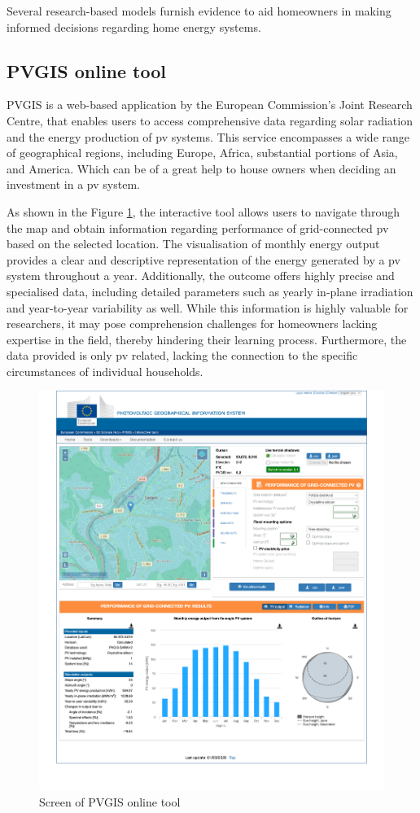 Several research-based models furnish evidence to aid homeowners in making informed decisions regarding home energy systems.


\subsection{PVGIS online tool}
PVGIS \cite{pvgis} is a web-based application by the European Commission's Joint Research Centre, 
that enables users to access comprehensive data regarding solar radiation and the energy production of \gls{pv} systems. 
This service encompasses a wide range of geographical regions, including Europe, Africa, substantial portions of Asia, and America.
Which can be of a great help to house owners when deciding an investment in a \gls{pv} system. 

As shown in the Figure \ref{fig:pvgis}, the interactive tool allows users to navigate through the map and obtain information regarding performance of grid-connected \gls{pv} based on the selected location. 
The visualisation of monthly energy output provides a clear and descriptive representation of the energy generated by a \gls{pv} system throughout a year. 
Additionally, the outcome offers highly precise and specialised data, including detailed parameters such as yearly in-plane irradiation and year-to-year variability as well. 
While this information is highly valuable for researchers, it may pose comprehension challenges for homeowners lacking expertise in the field, thereby hindering their learning process. 
Furthermore, the data provided is only \gls{pv} related, lacking the connection to the specific circumstances of individual households. 
\begin{figure}[h!]
  \centering
  \includegraphics[width=\textwidth]{Images/pvgis.png}
  \caption{Screen of PVGIS online tool}
  \label{fig:pvgis}
\end{figure}


